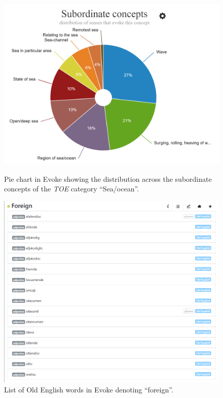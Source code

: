 \begin{figure}[h]
\centering
\begin{minipage}{.48\textwidth}
  \includegraphics[width=\textwidth]{Stolk2021x/fig/Dekker-sea-ocean.png}
	\caption[]{\label{fig:Stolk2021x:Dekker-fig1}Pie chart in Evoke showing the distribution across the subordinate concepts of the \textit{TOE} category ``Sea/ocean''.}
\end{minipage}
\begin{minipage}{.04\textwidth}\end{minipage}
\begin{minipage}{.48\textwidth}
  \includegraphics[width=\textwidth]{Stolk2021x/fig/Dekker-foreign.png}
	\caption[]{\label{fig:Stolk2021x:Dekker-fig2}List of Old English words in Evoke denoting ``foreign''.}
\end{minipage}
\end{figure}

